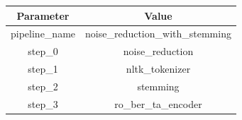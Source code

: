 \begin{tabular}{|c||c|}
\toprule
Parameter & Value \\ \midrule
\midrule
pipeline\_name & noise\_reduction\_with\_stemming \\ \midrule
step\_0 & noise\_reduction \\ \midrule
step\_1 & nltk\_tokenizer \\ \midrule
step\_2 & stemming \\ \midrule
step\_3 & ro\_ber\_ta\_encoder \\ \midrule
\bottomrule
\end{tabular}

